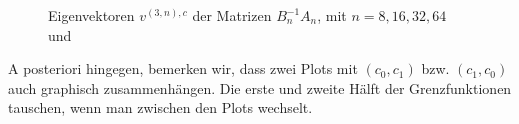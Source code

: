 \begin{figure}[H]
  \centering
  \hspace{0mm}
  \hspace{0mm}
  \caption{Eigenvektoren $v^{(3, n), c}$ der Matrizen $B_n^{-1} A_n$, mit $n = 8, 16, 32, 64$ und}
  \label{fig:Eigenvektoren_general_Vielfache}
\end{figure}

A posteriori hingegen, bemerken wir, dass zwei Plots mit $(c_0, c_1)$ bzw. $(c_1, c_0)$ auch graphisch zusammenhängen. Die erste und zweite Hälft der Grenzfunktionen tauschen, wenn man zwischen den Plots wechselt. \\

